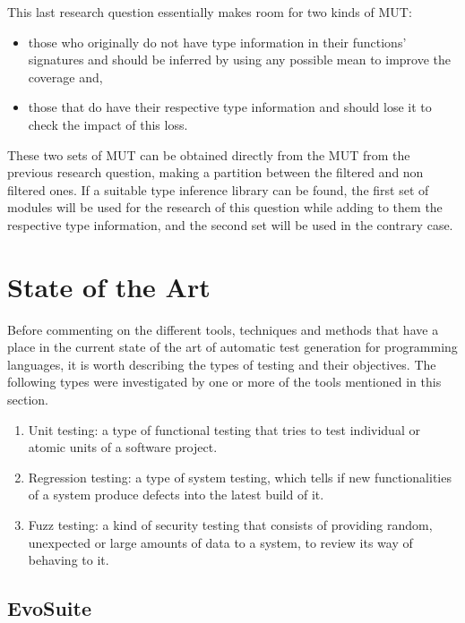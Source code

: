 \documentclass[%
  chapterprefix=false,%
  open=right,%
  twoside=true,%
  paper=a4,%
  logofile={Figures/logo.png},%
  thesistype=master,%
  UKenglish,%
]{se2thesis}
\begin{document}

This last research question essentially makes room for two kinds of MUT:\@
\begin{itemize}
  \item those who originally do not have type information in their functions' signatures and should be inferred by using any possible mean to improve the coverage and, 
  \item those that do have their respective type information and should lose it to check the impact of this loss.
\end{itemize}

These two sets of MUT can be obtained directly from the MUT from the previous research question, making a partition between the filtered and non filtered ones.
If a suitable type inference library can be found, the first set of modules will be used for the research of this question while adding to them the respective type information, and the second set will be used in the contrary case.


\chapter{State of the Art}

Before commenting on the different tools, techniques and methods that have a place in the current state of the art of automatic test generation for programming languages, it is worth describing the types of testing and their objectives. The following types were investigated by one or more of the tools mentioned in this section. 

\begin{enumerate}
  \item Unit testing: a type of functional testing that tries to test individual or atomic units of a software project.
  \item Regression testing: a type of system testing, which tells if new functionalities of a system produce defects into the latest build of it.
  \item Fuzz testing: a kind of security testing that consists of providing random, unexpected or large amounts of data to a system, to review its way of behaving to it.
\end{enumerate}

\section{EvoSuite}
\end{document}

